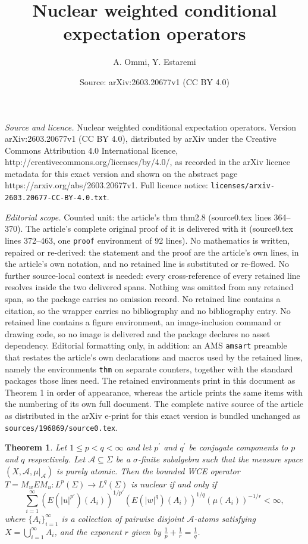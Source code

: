 \documentclass[10pt,a4paper]{amsart}
\title{Nuclear weighted conditional expectation operators}
\author{A. Ommi, Y. Estaremi}
\date{Source: arXiv:2603.20677v1 (CC BY 4.0)}
\newtheorem{thm}{Theorem}
\newcommand{\A}{\mathcal{A}}
\begin{document}
\maketitle

\noindent\emph{Source and licence.} Nuclear weighted conditional expectation operators. Version arXiv:2603.20677v1 (CC BY 4.0), distributed by arXiv under the Creative Commons Attribution 4.0 International licence, http://creativecommons.org/licenses/by/4.0/, as recorded in the arXiv licence metadata for this exact version and shown on the abstract page https://arxiv.org/abs/2603.20677v1. Full licence notice: \texttt{licenses/arxiv-2603.20677-CC-BY-4.0.txt}.\par\smallskip

\noindent\textit{Editorial scope.} Counted unit: the article's thm thm2.8 (source0.tex lines 364--370). The article's complete original proof of it is delivered with it (source0.tex lines 372--463, one \texttt{proof} environment of 92 lines). No mathematics is written, repaired or re-derived: the statement and the proof are the article's own lines, in the article's own notation, and no retained line is substituted or re-flowed.  No further source-local context is needed: every cross-reference of every retained line resolves inside the two delivered spans.  Nothing was omitted from any retained span, so the package carries no omission record.  No retained line contains a citation, so the wrapper carries no bibliography and no bibliography entry.  No retained line contains a figure environment, an image-inclusion command or drawing code, so no image is delivered and the package declares no asset dependency.  Editorial formatting only, in addition: an AMS \texttt{amsart} preamble that restates the article's own declarations and macros used by the retained lines, namely the environments \texttt{thm} on separate counters, together with the standard packages those lines need.  The retained environments print in this document as Theorem 1 in order of appearance, whereas the article prints the same items with the numbering of its own full document.  The complete native source of the article as distributed in the arXiv e-print for this exact version is bundled unchanged as \texttt{sources/196869/source0.tex}.
\begin{thm}\label{thm2.8}
	Let $1 \leq p<q < \infty$ and let \(p^{\prime}\) and \(q^{\prime}\) be conjugate components to \(p\) and \(q\) respectively. Let $\A \subseteq \Sigma$ be a $\sigma$-finite subalgebra such that the measure space $(X, \A, \mu|_{\A})$ is purely atomic. Then the bounded WCE operator $T = M_w E M_u : L^p(\Sigma) \to L^q(\Sigma)$ is nuclear if and only if
	\[
	\sum_{i=1}^{\infty} (E(|u|^{p'})(A_i))^{1/{p'}} (E(|w|^q)(A_i))^{1/q} (\mu(A_i))^{-1/r} < \infty,
	\]
	where $\{A_i\}_{i=1}^{\infty}$ is a collection of pairwise disjoint $\A$-atoms satisfying $X = \bigcup_{i=1}^{\infty} A_i$, and the exponent $r$ given by $\frac{1}{p} + \frac{1}{r} = \frac{1}{q}$.
\end{thm}
\end{document}
